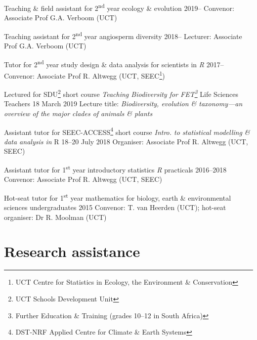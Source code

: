 \documentclass[10pt]{article}
\begin{document}
\begin{hangparas}{2em}{1}

Teaching \& field assistant for 2\textsuperscript{nd} year ecology \& evolution
                                                   \hfill {\small 2019--} \break
Convenor: Associate Prof G.A. Verboom (UCT)

Teaching assistant for 2\textsuperscript{nd} year angiosperm diversity
                                                   \hfill {\small 2018--} \break
Lecturer: Associate Prof G.A. Verboom (UCT)

Tutor for 2\textsuperscript{nd} year study design \& data analysis for 
scientists in \textit{R}                           \hfill {\small 2017--} \break
Convenor: Associate Prof R. Altwegg (UCT, SEEC\footnote{UCT Centre for 
Statistics in Ecology, the Environment \& Conservation})

Lectured for SDU\footnote{UCT Schools Development Unit} short course 
\textit{Teaching Biodiversity for FET\footnote{Further Education \& Training
(grades 10--12 in South Africa)}} Life Sciences Teachers
                                            \hfill {\small 18 March 2019} \break
Lecture title: \textit{Biodiversity, evolution \& taxonomy---an overview of the 
major clades of animals \& plants}

Assistant tutor for SEEC-ACCESS\footnote{DST-NRF Applied Centre for Climate \&
Earth Systems} short course \textit{Intro. to statistical modelling \& data 
analysis in} R                           \hfill {\small 18--20 July 2018} \break
Organiser: Associate Prof R. Altwegg (UCT, SEEC)

Assistant tutor for 1\textsuperscript{st} year introductory statistics
\textit{R} practicals                          \hfill {\small 2016--2018} \break
Convenor: Associate Prof R. Altwegg (UCT, SEEC)

Hot-seat tutor for 1\textsuperscript{st} year mathematics for biology, earth \& 
environmental sciences undergraduates                \hfill {\small 2015} \break
Convenor: T. van Heerden (UCT); hot-seat organiser: Dr R. Moolman (UCT)

\hfill

\end{hangparas}

\clearpage

\section*{Research assistance} %
\end{document}
